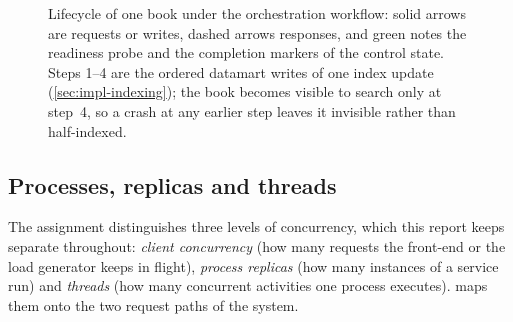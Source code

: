 \documentclass[10pt,a4paper]{article}
\begin{document}
\begin{figure}[htbp]
  \caption{Lifecycle of one book under the orchestration workflow: solid arrows
  are requests or writes, dashed arrows responses, and green notes the readiness
  probe and the completion markers of the control state. Steps 1--4 are the
  ordered datamart writes of one index update (\cref{sec:impl-indexing}); the
  book becomes visible to search only at step~4, so a crash at any earlier step
  leaves it invisible rather than half-indexed.}
  \label{fig:lifecycle}
\end{figure}

\subsection{Processes, replicas and threads}
\label{sec:replicas-threads}

The assignment distinguishes three levels of concurrency, which this report
keeps separate throughout: \emph{client concurrency} (how many requests the
front-end or the load generator keeps in flight), \emph{process replicas} (how
many instances of a service run) and \emph{threads} (how many concurrent
activities one process executes).  maps them onto the
two request paths of the system.
\end{document}
